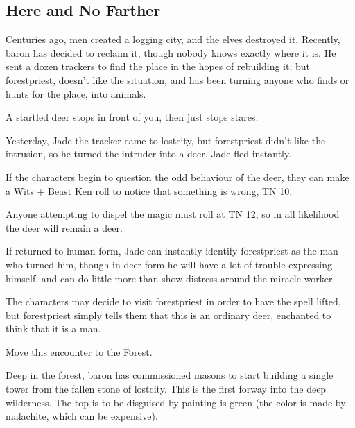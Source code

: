 \begin{multicols}{2}

\subsection[Here and No Farther]{Here and No Farther -- \encnum}\label{herenofarther}

Centuries ago, men created a logging city, and the elves destroyed it.  Recently, \gls{baron} has decided to reclaim it, though nobody knows exactly where it is.  He sent a dozen trackers to find the place in the hopes of rebuilding it; but \gls{forestpriest}, doesn't like the situation, and has been turning anyone who finds or hunts for the place, into animals.


\begin{boxtext}

	A startled deer stops in front of you, then just stops stares.

\end{boxtext}

Yesterday, Jade the tracker came to \gls{lostcity}, but \gls{forestpriest} didn't like the intrusion, so he turned the intruder into a deer.
Jade fled instantly.

If the characters begin to question the odd behaviour of the deer, they can make a Wits + Beast Ken roll to notice that something is wrong, TN 10.

Anyone attempting to dispel the magic must roll at TN 12, so in all likelihood the deer will remain a deer.


If returned to human form, Jade can instantly identify \gls{forestpriest} as the man who turned him, though in deer form he will have a lot of trouble expressing himself, and can do little more than show distress around the miracle worker.

The characters may decide to visit \gls{forestpriest} in order to have the spell lifted, but \gls{forestpriest} simply tells them that this is an ordinary deer, enchanted to think that it is a man.

Move this encounter to the Forest.


Deep in the forest, \gls{baron} has commissioned masons to start building a single tower from the fallen stone of \gls{lostcity}. This is the first forway into the deep wilderness.  The top is to be disguised by painting is green (the color is made by malachite, which can be expensive).


\end{multicols}
